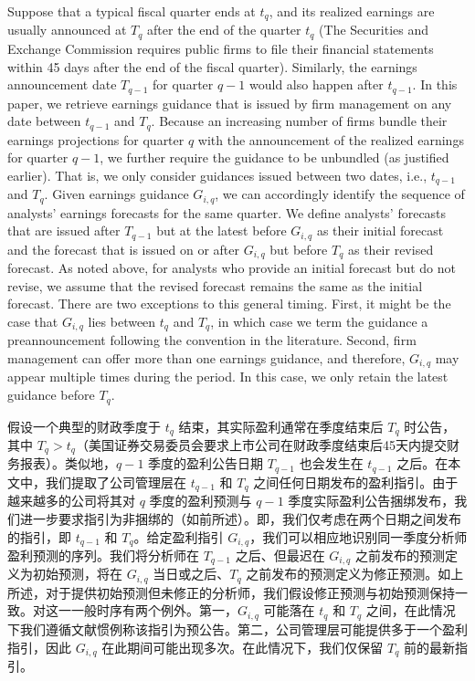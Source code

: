 \documentclass[12pt,a4paper]{article}
\newenvironment{original}
  {\par\medskip\noindent\ignorespaces}
  {\par\medskip}
\newenvironment{translation}
  {\par\noindent{\color{transblue}\ignorespaces}}
  {\par\bigskip}
\begin{document}
\begin{original}
Suppose that a typical fiscal quarter ends at $t_q$, and its realized earnings are usually announced at $T_q$ after the end of the quarter $t_q$ (The Securities and Exchange Commission requires public firms to file their financial statements within 45 days after the end of the fiscal quarter). Similarly, the earnings announcement date $T_{q-1}$ for quarter $q-1$ would also happen after $t_{q-1}$. In this paper, we retrieve earnings guidance that is issued by firm management on any date between $t_{q-1}$ and $T_q$. Because an increasing number of firms bundle their earnings projections for quarter $q$ with the announcement of the realized earnings for quarter $q-1$, we further require the guidance to be unbundled (as justified earlier). That is, we only consider guidances issued between two dates, i.e., $t_{q-1}$ and $T_q$. Given earnings guidance $G_{i,q}$, we can accordingly identify the sequence of analysts' earnings forecasts for the same quarter. We define analysts' forecasts that are issued after $T_{q-1}$ but at the latest before $G_{i,q}$ as their initial forecast and the forecast that is issued on or after $G_{i,q}$ but before $T_q$ as their revised forecast. As noted above, for analysts who provide an initial forecast but do not revise, we assume that the revised forecast remains the same as the initial forecast. There are two exceptions to this general timing. First, it might be the case that $G_{i,q}$ lies between $t_q$ and $T_q$, in which case we term the guidance a preannouncement following the convention in the literature. Second, firm management can offer more than one earnings guidance, and therefore, $G_{i,q}$ may appear multiple times during the period. In this case, we only retain the latest guidance before $T_q$.
\end{original}
\begin{translation}
假设一个典型的财政季度于 $t_q$ 结束，其实际盈利通常在季度结束后 $T_q$ 时公告，其中 $T_q > t_q$（美国证券交易委员会要求上市公司在财政季度结束后45天内提交财务报表）。类似地，$q-1$ 季度的盈利公告日期 $T_{q-1}$ 也会发生在 $t_{q-1}$ 之后。在本文中，我们提取了公司管理层在 $t_{q-1}$ 和 $T_q$ 之间任何日期发布的盈利指引。由于越来越多的公司将其对 $q$ 季度的盈利预测与 $q-1$ 季度实际盈利公告捆绑发布，我们进一步要求指引为非捆绑的（如前所述）。即，我们仅考虑在两个日期之间发布的指引，即 $t_{q-1}$ 和 $T_q$。给定盈利指引 $G_{i,q}$，我们可以相应地识别同一季度分析师盈利预测的序列。我们将分析师在 $T_{q-1}$ 之后、但最迟在 $G_{i,q}$ 之前发布的预测定义为初始预测，将在 $G_{i,q}$ 当日或之后、$T_q$ 之前发布的预测定义为修正预测。如上所述，对于提供初始预测但未修正的分析师，我们假设修正预测与初始预测保持一致。对这一一般时序有两个例外。第一，$G_{i,q}$ 可能落在 $t_q$ 和 $T_q$ 之间，在此情况下我们遵循文献惯例称该指引为预公告。第二，公司管理层可能提供多于一个盈利指引，因此 $G_{i,q}$ 在此期间可能出现多次。在此情况下，我们仅保留 $T_q$ 前的最新指引。
\end{translation}
\end{document}
